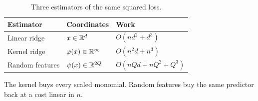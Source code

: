 \begin{table}[ht]
\centering
\caption{Three estimators of the same squared loss.}
\label{tab:costs}
\begin{tabular}{lll}
\toprule
Estimator & Coordinates & Work \\
\midrule
Linear ridge & \(x\in\mathbb{R}^d\) & \(O(nd^2+d^3)\) \\
Kernel ridge & \(\varphi(x)\in\mathbb{R}^\infty\) & \(O(n^2 d+n^3)\) \\
Random features & \(\psi(x)\in\mathbb{R}^{2Q}\) & \(O(nQd+nQ^2+Q^3)\) \\
\bottomrule
\end{tabular}
\end{table}

\noindent
The kernel buys every scaled monomial. Random features buy the same predictor back at a cost linear in \(n\).
